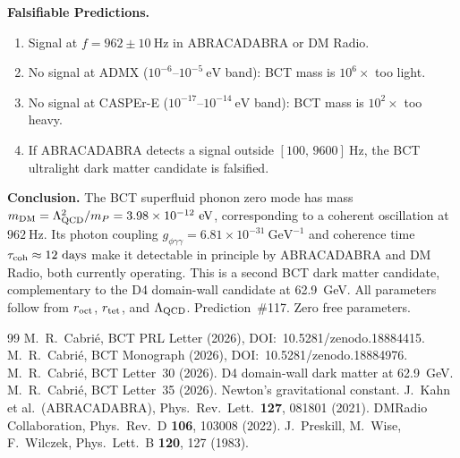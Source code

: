 \documentclass[aps,prl,twocolumn,superscriptaddress,floatfix]{revtex4-2}
\begin{document}
\medskip
\noindent\textbf{Falsifiable Predictions.}
\begin{enumerate}
\item Signal at $f = 962 \pm 10\ \mathrm{Hz}$ in ABRACADABRA or DM Radio.
\item No signal at ADMX ($10^{-6}$--$10^{-5}\ \mathrm{eV}$ band):
  BCT mass is $10^6\times$ too light.
\item No signal at CASPEr-E ($10^{-17}$--$10^{-14}\ \mathrm{eV}$ band):
  BCT mass is $10^2\times$ too heavy.
\item If ABRACADABRA detects a signal outside $[100,\,9600]\ \mathrm{Hz}$,
  the BCT ultralight dark matter candidate is falsified.
\end{enumerate}

\medskip
\noindent\textbf{Conclusion.}
The BCT superfluid phonon zero mode has mass
$m_{\rm DM} = \Lambda_{\rm QCD}^2/m_P = 3.98\times10^{-12}\ \mathrm{eV}$,
corresponding to a coherent oscillation at $962\ \mathrm{Hz}$.
Its photon coupling $g_{\phi\gamma\gamma} = 6.81\times10^{-31}\ \mathrm{GeV}^{-1}$
and coherence time $\tau_{\rm coh} \approx 12\ \mathrm{days}$ make it
detectable in principle by ABRACADABRA and DM Radio, both currently operating.
This is a second BCT dark matter candidate, complementary to the D4 domain-wall
candidate at 62.9~GeV. All parameters follow from $r_{\rm oct}$, $r_{\rm tet}$,
and $\Lambda_{\rm QCD}$. Prediction~\#117. Zero free parameters.

\begin{thebibliography}{99}
 M.~R.~Cabri\'e, BCT PRL Letter (2026), DOI:~10.5281/zenodo.18884415.
 M.~R.~Cabri\'e, BCT Monograph (2026), DOI:~10.5281/zenodo.18884976.
 M.~R.~Cabri\'e, BCT Letter~30 (2026). D4 domain-wall dark matter at 62.9~GeV.
 M.~R.~Cabri\'e, BCT Letter~35 (2026). Newton's gravitational constant.
 J.~Kahn et al.\ (ABRACADABRA),
  Phys.\ Rev.\ Lett.\ \textbf{127}, 081801 (2021).
 DMRadio Collaboration,
  Phys.\ Rev.\ D \textbf{106}, 103008 (2022).
 J.~Preskill, M.~Wise, F.~Wilczek,
  Phys.\ Lett.\ B \textbf{120}, 127 (1983).
\end{thebibliography}
\end{document}

